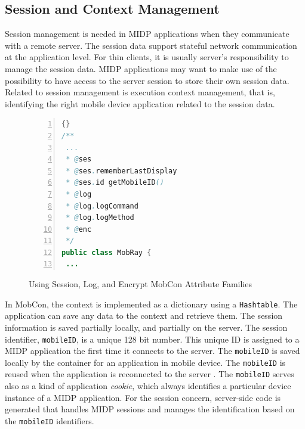 \subsection{Session and Context Management}
\label{sec.mb.session}

Session management is needed in MIDP applications when they communicate with a remote server. The session data support stateful network communication at the application level. For thin clients, it is usually server's responsibility to manage the session data. MIDP applications may want to make use of the possibility to have access to the server session to store their own session data. Related to session management is execution context management, that is, identifying the right mobile device application related to the session data. 

\begin{figure}[ht]
	\begin{center}
		\begin{minipage}[t]{5cm}
		\begin{scriptsize}
\begin{lstlisting}[numbers=left,language=Java,frame=leftline]{}
/**
 ...
 * @ses
 * @ses.rememberLastDisplay
 * @ses.id getMobileID()
 * @log
 * @log.logCommand
 * @log.logMethod
 * @enc
 */
public class MobRay {
 ...
\end{lstlisting}
		\end{scriptsize}
			\end{minipage}
	\end{center}
	\caption{Using Session, Log, and Encrypt MobCon Attribute Families}
\label{fig:mob.ses}
\end{figure}

In MobCon, the context is implemented as a dictionary using a \texttt{Hash\-ta\-ble}. The application can save any data to the context and retrieve them. The session information is saved partially locally, and partially on the server. The session identifier, \texttt{mo\-bi\-le\-ID}, is a unique 128 bit number. This unique ID is assigned to a MIDP application the first time it connects to the server. The \texttt{mo\-bi\-le\-ID} is saved locally by the container for an application in mobile device. The \texttt{mo\-bi\-le\-ID} is reused when the application is reconnected to the server . The \texttt{mo\-bi\-le\-ID} serves also as a kind of application \textit{cookie}, which always identifies a particular device instance of a MIDP application. For the session concern, server-side code is generated that handles MIDP sessions and manages the identification based on the \texttt{mo\-bi\-le\-ID} identifiers.

